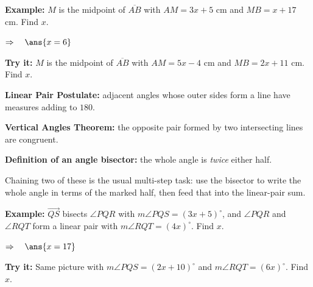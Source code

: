 \documentclass[12pt]{article}
\begin{document}
\begin{examplebox}
\textbf{Example:} \quad $M$ is the midpoint of $\overline{AB}$ with $AM = 3x + 5$ cm and $MB = x + 17$ cm. Find $x$.

$\Rightarrow\quad \ans{x = 6}$
\end{examplebox}

\begin{tryitbox}
\textbf{Try it:} \quad $M$ is the midpoint of $\overline{AB}$ with $AM = 5x - 4$ cm and $MB = 2x + 11$ cm. Find $x$.\\[2pt]
\end{tryitbox}


\begin{formulabox}
\textbf{Linear Pair Postulate:} adjacent angles whose outer sides form a line have measures adding to $180$.\par
\textbf{Vertical Angles Theorem:} the opposite pair formed by two intersecting lines are congruent.\par
\textbf{Definition of an angle bisector:} the whole angle is \emph{twice} either half.\par
Chaining two of these is the usual multi-step task: use the bisector to write the whole angle in terms of the marked half, then feed that into the linear-pair sum.
\end{formulabox}

\begin{examplebox}
\textbf{Example:} \quad $\overrightarrow{QS}$ bisects $\angle PQR$ with $m\angle PQS = (3x + 5)^\circ$, and $\angle PQR$ and $\angle RQT$ form a linear pair with $m\angle RQT = (4x)^\circ$. Find $x$.

$\Rightarrow\quad \ans{x = 17}$
\end{examplebox}

\begin{tryitbox}
\textbf{Try it:} \quad Same picture with $m\angle PQS = (2x + 10)^\circ$ and $m\angle RQT = (6x)^\circ$. Find $x$.\\[2pt]
\end{tryitbox}
\end{document}
